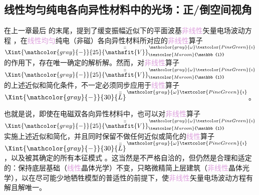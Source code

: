 \subsection{线性均匀纯电各向异性材料中的光场：正/倒空间视角}\label{ssec:3times2sandwich-eigen-matrices}

在上一章最后  的末尾，提到了\textcolor{NavyBlue}{缓变振幅近似}下的\textcolor{PineGreen}{平面波基}\textcolor{Plum}{非线性}矢量电场波动方程 ，在\textcolor{Plum}{线性}\textcolor{Plum}{均匀}\textcolor{PineGreen}{纯电（非磁）各向异性}材料所对应的\textcolor{Plum}{非线性}算子 $\Xint{\mathcolor{gray}{-}}{25}{\bar{\bar{\mathsfit{V}}}}^{\;\! \mathcolor{gray}{\omega} \textcolor{PineGreen}{\imath}}_{\textcolor{Maroon}{\mathbb{1}}}$ 的作用下，存在唯一确定的解析解。然而，对\textcolor{Plum}{非线性}算子 $\Xint{\mathcolor{gray}{-}}{25}{\bar{\bar{\mathsfit{V}}}}^{\;\! \mathcolor{gray}{\omega} \textcolor{PineGreen}{\imath}}_{\textcolor{Maroon}{\mathbb{1}}}$ 的上述近似和简化条件，不一定必须同步应用于\textcolor{Plum}{线性}算子 $\Xint{\mathcolor{gray}{-}}{30}{\bar{\bar{L}}}^{\;\! \mathcolor{gray}{\omega} \textcolor{PineGreen}{\imath}}$。

也就是说，即使在电磁\textcolor{PineGreen}{双各向异性}材料中，也可以对\textcolor{Plum}{非线性}算子 $\Xint{\mathcolor{gray}{-}}{25}{\bar{\bar{\mathsfit{V}}}}^{\;\! \mathcolor{gray}{\omega} \textcolor{PineGreen}{\imath}}_{\textcolor{Maroon}{\mathbb{1}}}$  实施上述近似和简化，并且同时保留不做任何近似或简化的\textcolor{Plum}{线性}算子 $\Xint{\mathcolor{gray}{-}}{30}{\bar{\bar{L}}}^{\;\! \mathcolor{gray}{\omega} \textcolor{PineGreen}{\imath}}$ ，以及被其确定的所有\textcolor{PineGreen}{本征模}式 。这当然是不严格自洽的，但仍然是合理和适定的：保持底层基础（\textcolor{Plum}{线性}\textcolor{PineGreen}{晶体光学}）不变，只略微精简上层建筑（\textcolor{Plum}{非线性}\textcolor{PineGreen}{晶体光学}），以在尽可能少地牺牲模型的普适性的前提下，使\textcolor{Plum}{非线性}矢量电场波动方程有解且解唯一。

